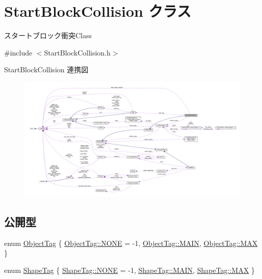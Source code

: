 \hypertarget{class_start_block_collision}{}\section{Start\+Block\+Collision クラス}
\label{class_start_block_collision}


スタートブロック衝突\+Class  




{\ttfamily \#include $<$Start\+Block\+Collision.\+h$>$}



Start\+Block\+Collision 連携図\nopagebreak
\begin{figure}[H]
\begin{center}
\leavevmode
\includegraphics[width=350pt]{class_start_block_collision__coll__graph}
\end{center}
\end{figure}
\subsection*{公開型}
\begin{DoxyCompactItemize}
\item 
enum \mbox{\hyperlink{class_start_block_collision_af6bc5a437ac6427dbf664269c22c8e13}{Object\+Tag}} \{ \mbox{\hyperlink{class_start_block_collision_af6bc5a437ac6427dbf664269c22c8e13ab50339a10e1de285ac99d4c3990b8693}{Object\+Tag\+::\+N\+O\+NE}} = -\/1, 
\mbox{\hyperlink{class_start_block_collision_af6bc5a437ac6427dbf664269c22c8e13a186495f7da296bf880df3a22a492b378}{Object\+Tag\+::\+M\+A\+IN}}, 
\mbox{\hyperlink{class_start_block_collision_af6bc5a437ac6427dbf664269c22c8e13a26a4b44a837bf97b972628509912b4a5}{Object\+Tag\+::\+M\+AX}}
 \}
\item 
enum \mbox{\hyperlink{class_start_block_collision_a2248356335da3741aefdbce33b1052b5}{Shape\+Tag}} \{ \mbox{\hyperlink{class_start_block_collision_a2248356335da3741aefdbce33b1052b5ab50339a10e1de285ac99d4c3990b8693}{Shape\+Tag\+::\+N\+O\+NE}} = -\/1, 
\mbox{\hyperlink{class_start_block_collision_a2248356335da3741aefdbce33b1052b5a186495f7da296bf880df3a22a492b378}{Shape\+Tag\+::\+M\+A\+IN}}, 
\mbox{\hyperlink{class_start_block_collision_a2248356335da3741aefdbce33b1052b5a26a4b44a837bf97b972628509912b4a5}{Shape\+Tag\+::\+M\+AX}}
 \}
\end{DoxyCompactItemize}
